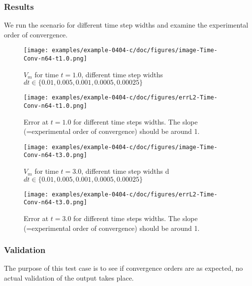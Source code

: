 \subsubsection{Results}
We run the scenario for different time step widths and examine the experimental order of convergence.
%
%
%
%
\begin{figure}[h!]
    \centering 
    \texttt{[image: examples/example-0404-c/doc/figures/image-Time-Conv-n64-t1.0.png]} 
    \caption{$V_m$ for time $t=1.0$, different time step widths ${dt \in \{0.01, 0.005, 0.001, 0.0005, 0.00025\}}$}
    \label{example-0404-c-vm-1.0}
\end{figure}
%
\begin{figure}[h!]
    \centering 
    \texttt{[image: examples/example-0404-c/doc/figures/errL2-Time-Conv-n64-t1.0.png]} 
    \caption{Error at $t=1.0$ for different time steps widths. The slope (=experimental order of convergence) should be around 1.}
    \label{example-0404-c-error-1.0}
\end{figure}
\begin{figure}[h!]
    \centering 
    \texttt{[image: examples/example-0404-c/doc/figures/image-Time-Conv-n64-t3.0.png]} 
    \caption{$V_m$ for time $t=3.0$, different time step widths d${dt \in \{0.01, 0.005, 0.001, 0.0005, 0.00025\}}$}
    \label{example-0404-c-vm-3.0}
\end{figure}
%
\begin{figure}[h!]
    \centering 
    \texttt{[image: examples/example-0404-c/doc/figures/errL2-Time-Conv-n64-t3.0.png]} 
    \caption{Error at $t=3.0$ for different time steps widths. The slope (=experimental order of convergence) should be around 1.}
    \label{example-0404-c-error-3.0}
\end{figure}
%
%
%
\subsubsection{Validation}
%
The purpose of this test case is to see if convergence orders are as expected, no actual validation of the output takes place.
%
